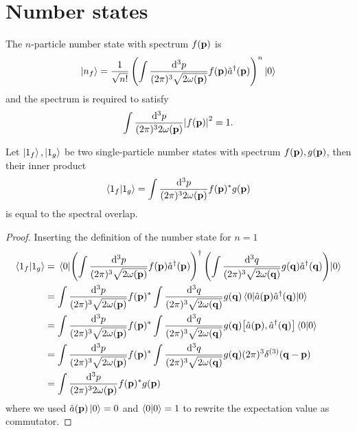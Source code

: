 \section{Number states}

\begin{definition}\label{def:qkg_number_state}
	The $n$-particle number state with spectrum $f(\vb{p})$ is
	\begin{equation}
		\ket{n_f}
		=
		\frac{1}{\sqrt{n!}}
		\left(
			\int\frac{\dd[3]{p}}{(2\pi)^3\sqrt{2\omega(\vb{p})}}
			f(\vb{p})
			\hat{a}^\dagger(\vb{p})
		\right)^n
		\ket{0}
		\label{eq:qkg_number_state}
	\end{equation}
	and the spectrum is required to satisfy
	\begin{equation}
		\int\frac{\dd[3]{p}}{(2\pi)^32\omega(\vb{p})}
		\abs{f(\vb{p})}^2
		=
		1
		\label{eq:number_state_spectrum_constraint}
		.
	\end{equation}
\end{definition}

\begin{lemma}\label{thm:qkg_number_state_inner_single}
	Let $\ket{1_f},\ket{1_g}$ be two single-particle number states with spectrum $f(\vb{p}),g(\vb{p})$, then their inner product
	\begin{equation}
		\braket{1_f}{1_g}
		=
		\int\frac{\dd[3]{p}}{(2\pi)^32\omega(\vb{p})}
		f(\vb{p})^*
		g(\vb{p})
	\end{equation}
	is equal to the spectral overlap.
\end{lemma}
\begin{proof}
	Inserting the definition of the number state for $n=1$
	\begin{equation*}
		\begin{split}
			\braket{1_f}{1_g}
			&=
			\expval{
				\left(
					\int\frac{\dd[3]{p}}{(2\pi)^3\sqrt{2\omega(\vb{p})}}
					f(\vb{p})
					\hat{a}^\dagger(\vb{p})
				\right)^\dagger
				\left(
					\int\frac{\dd[3]{q}}{(2\pi)^3\sqrt{2\omega(\vb{q})}}
					g(\vb{q})
					\hat{a}^\dagger(\vb{q})
				\right)
			}{0}
			\\
			&=
			\int\frac{\dd[3]{p}}{(2\pi)^3\sqrt{2\omega(\vb{p})}}
			f(\vb{p})^*
			\int\frac{\dd[3]{q}}{(2\pi)^3\sqrt{2\omega(\vb{q})}}
			g(\vb{q})
			\expval{\hat{a}(\vb{p})\hat{a}^\dagger(\vb{q})}{0}
			\\
			&=
			\int\frac{\dd[3]{p}}{(2\pi)^3\sqrt{2\omega(\vb{p})}}
			f(\vb{p})^*
			\int\frac{\dd[3]{q}}{(2\pi)^3\sqrt{2\omega(\vb{q})}}
			g(\vb{q})
			\comm{\hat{a}(\vb{p})}{\hat{a}^\dagger(\vb{q})}
			\braket{0}
			\\
			&=
			\int\frac{\dd[3]{p}}{(2\pi)^3\sqrt{2\omega(\vb{p})}}
			f(\vb{p})^*
			\int\frac{\dd[3]{q}}{(2\pi)^3\sqrt{2\omega(\vb{q})}}
			g(\vb{q})
			(2\pi)^3\delta^{(3)}(\vb{q}-\vb{p})
			\\
			&=
			\int\frac{\dd[3]{p}}{(2\pi)^32\omega(\vb{p})}
			f(\vb{p})^*
			g(\vb{p})
		\end{split}
	\end{equation*}
	where we used $\hat{a}(\vb{p})\ket{0}=0$ and $\braket{0}=1$ to rewrite the expectation value as commutator.
\end{proof}

